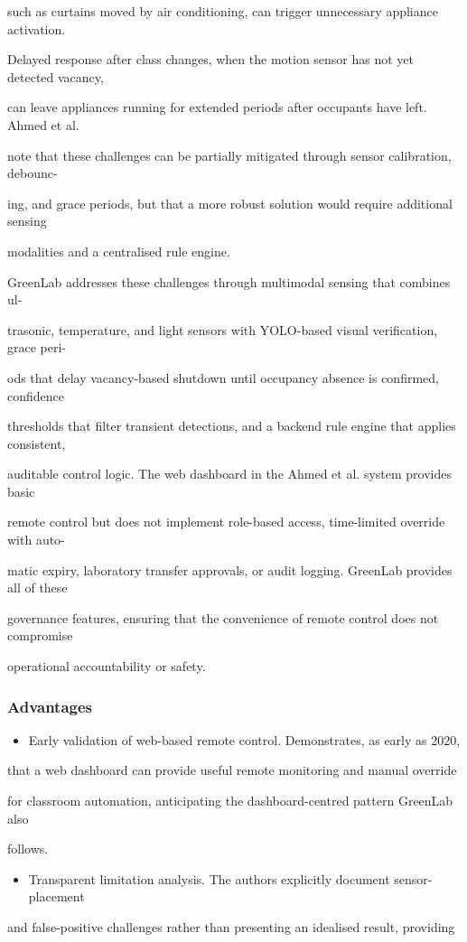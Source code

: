 such as curtains moved by air conditioning, can trigger unnecessary appliance activation.

Delayed response after class changes, when the motion sensor has not yet detected vacancy,

can leave appliances running for extended periods after occupants have left. Ahmed et al.

note that these challenges can be partially mitigated through sensor calibration, debounc-

ing, and grace periods, but that a more robust solution would require additional sensing

modalities and a centralised rule engine.

GreenLab addresses these challenges through multimodal sensing that combines ul-

trasonic, temperature, and light sensors with YOLO-based visual veriﬁcation, grace peri-

ods that delay vacancy-based shutdown until occupancy absence is conﬁrmed, conﬁdence

thresholds that ﬁlter transient detections, and a backend rule engine that applies consistent,

auditable control logic. The web dashboard in the Ahmed et al. system provides basic

remote control but does not implement role-based access, time-limited override with auto-

matic expiry, laboratory transfer approvals, or audit logging. GreenLab provides all of these

governance features, ensuring that the convenience of remote control does not compromise

operational accountability or safety.


\subsubsection*{Advantages}
\begin{itemize}
	\item Early validation of web-based remote control. Demonstrates, as early as 2020,
\end{itemize}
that a web dashboard can provide useful remote monitoring and manual override

for classroom automation, anticipating the dashboard-centred pattern GreenLab also

follows.

\begin{itemize}
	\item Transparent limitation analysis. The authors explicitly document sensor-placement
\end{itemize}
and false-positive challenges rather than presenting an idealised result, providing

